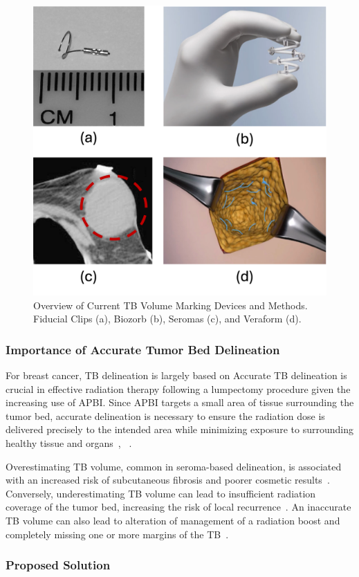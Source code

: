 \begin{figure}[h!]
        \centering
        \includegraphics[width=\linewidth]{../figs/introduction/current_devices_overview.png}
        \caption{Overview of Current TB Volume Marking Devices and Methods. Fiducial Clips (a), Biozorb (b), Seromas (c), and Veraform (d).}
        \label{fig:introduction:current_devices_overview}
\end{figure}

\subsubsection{Importance of Accurate Tumor Bed Delineation\label{sec:introduction:motivation:importanceofaccuratetumorbeddelineation}}

For breast cancer, TB delineation is largely based on Accurate TB delineation is crucial in effective radiation therapy following a lumpectomy procedure given the increasing use of APBI. Since APBI targets a small area of tissue surrounding the tumor bed, accurate delineation is necessary to ensure the radiation dose is delivered precisely to the intended area while minimizing exposure to surrounding healthy tissue and organs~\cite{RefWorks:RefID:197-den2015postlumpectomy}, ~\cite{RefWorks:RefID:25-acree2022review}.

Overestimating TB volume, common in seroma-based delineation, is associated with an increased risk of subcutaneous fibrosis and poorer cosmetic results~\cite{RefWorks:RefID:197-den2015postlumpectomy}. Conversely, underestimating TB volume can lead to insufficient radiation coverage of the tumor bed, increasing the risk of local recurrence~\cite{RefWorks:RefID:198-jiao2024interobserver}. An inaccurate TB volume can
also lead to alteration of management of a radiation boost and completely missing one or more margins of the TB~\cite{RefWorks:RefID:344-mitchell2019adaptable}.



\subsubsection{Proposed Solution\label{sec:introduction:motivation:proposedsolution}}
